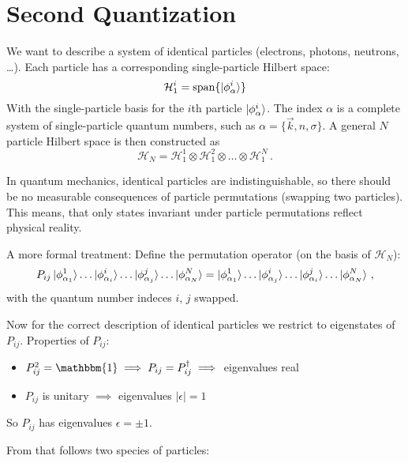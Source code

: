 \documentclass[../classnotes.tex]{subfiles}
\begin{document}
\chapter{Second Quantization}\label{ch:second-quantization}

We want to describe a system of identical particles (electrons, photons, neutrons, \ldots).
Each particle has a corresponding single-particle Hilbert space:
\begin{equation}
    \mathcal{H}_1^i = \operatorname{span}\{\ket{\phi_{\alpha}^i}\}   
\end{equation}
With the single-particle basis for the \(i\)th particle \(\ket{\phi_{\alpha}^i}\).
The index \(\alpha\) is a complete system of single-particle quantum numbers, such as \(\alpha = \{\vec{k}, n, \sigma\}\).
A general \(N\) particle Hilbert space is then constructed as
\begin{equation}
    \mathcal{H}_N = \mathcal{H}_1^1 \otimes \mathcal{H}_1^2 \otimes \ldots \otimes \mathcal{H}_1^N\,.
\end{equation}

In quantum mechanics, identical particles are indistinguishable, so there should be no measurable consequences of particle permutations (swapping two particles).
This means, that only states invariant under particle permutations reflect physical reality.

A more formal treatment:
Define the permutation operator (on the basis of \(\mathcal{H}_N\)):
\begin{equation}
    P_{ij} \ket{\phi_{\alpha_1}^1} \ldots \ket{\phi_{\alpha_i}^i} \ldots \ket{\phi_{\alpha_j}^j} \ldots \ket{\phi_{\alpha_N}^N} = \ket{\phi_{\alpha_1}^1} \ldots \ket{\phi_{\alpha_j}^i} \ldots \ket{\phi_{\alpha_i}^j} \ldots \ket{\phi_{\alpha_N}^N} \,,
\end{equation}
with the quantum number indeces \(i\), \(j\) swapped.

Now for the correct description of identical particles we restrict to eigenstates of \(P_{ij}\).
Properties of \(P_{ij}\):
\begin{itemize}
    \item \(P_{ij}^2 = \mathbbm{1} \implies P_{ij} = P_{ij}^{\dagger} \implies\)  eigenvalues real
    \item \(P_{ij}\) is unitary \(\implies\) eigenvalues \(\vert \epsilon \vert = 1\)
\end{itemize}
So \(P_{ij}\) has eigenvalues \(\epsilon = \pm 1\).

From that follows two species of particles:
\end{document}
